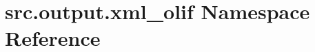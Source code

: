 \hypertarget{namespacesrc_1_1output_1_1xml__olif}{\section{src.\+output.\+xml\+\_\+olif Namespace Reference}
\label{namespacesrc_1_1output_1_1xml__olif}
}
